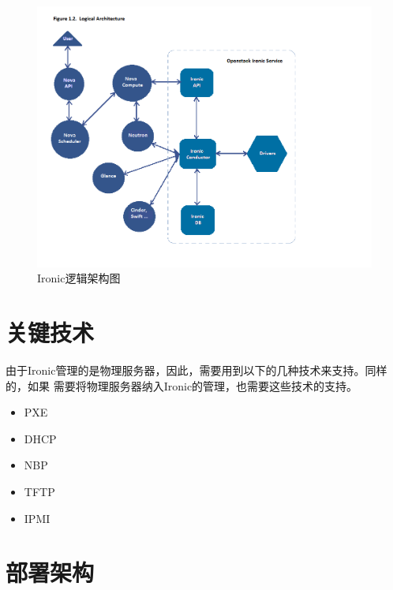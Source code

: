 \begin{figure}[H]
  \centering
  \includegraphics[scale=0.8]{logical_architecture.png}
  \caption{Ironic逻辑架构图\protect\footnotemark}
  \label{fig:logical_architecture}
\end{figure}

\section{关键技术}
由于Ironic管理的是物理服务器，因此，需要用到以下的几种技术来支持。同样的，如果
需要将物理服务器纳入Ironic的管理，也需要这些技术的支持。

\begin{itemize}
  \item PXE
  \item DHCP
  \item NBP
  \item TFTP
  \item IPMI
\end{itemize}

\section{部署架构}

